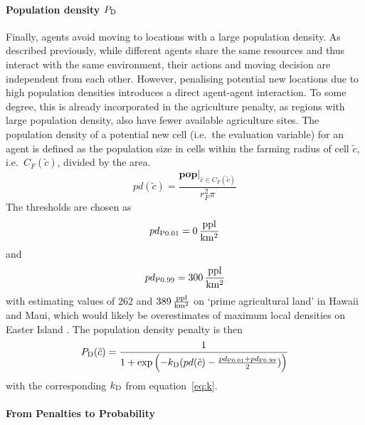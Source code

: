 \paragraph{Population density $P_{\rm D}$}
Finally, agents avoid moving to locations with a large population density.
As described previously, while different agents share the same resources and thus interact with the same environment, their actions and moving decision are independent from each other. 
However, penalising potential new locations due to high population densities introduces a direct agent-agent interaction. 
To some degree, this is already incorporated in the agriculture penalty, as regions with large population density, also have fewer available agriculture sites.
The population density of a potential new cell (i.e.\ the evaluation variable) for an agent is defined as the population size in cells within the farming radius of cell $\tilde{c}$, i.e.\ $C_F(\tilde{c})$, divided by the area.
\begin{equation}
	pd (\tilde{c}) = \frac{\mathbf{pop}|_{\hat{c} \in C_F(\tilde{c}) }}{r_F^2 \pi}
\end{equation}
The thresholds are chosen as
\begin{equation}
	pd_{\rm P0.01} = 0 \, {\rm \frac{ppl}{km^2}}
\end{equation}
and 
\begin{equation}
	pd_{\rm P0.99} = 300 \, {\rm \frac{ppl}{km^2}}
\end{equation}
with \citet{Kirch2010} estimating values of $262$ and $389\, {\rm \frac{ppl}{km^2}}$ on `prime agricultural land' in Hawaii and Maui, which would likely be overestimates of maximum local densities on Easter Island \citep{Puleston2017}. %
The population density penalty is then
\begin{equation}
	P_{\rm D}(\tilde{c}) = \frac{1}{1+\exp\left( - k_{\rm D} (pd(\tilde{c})-\frac{pd_{\rm P0.01} + pd_{\rm P0.99}}{2}) \right)}
\end{equation}
with the corresponding $k_{\rm D}$ from equation~\ref{eq:k}.


\paragraph{From Penalties to Probability}


